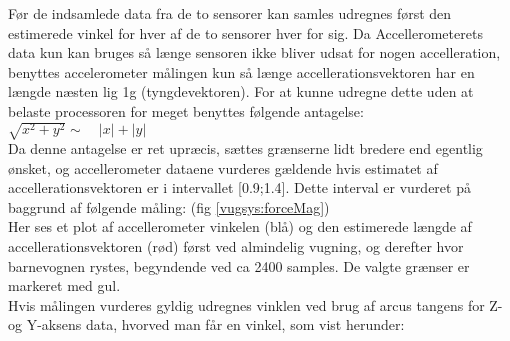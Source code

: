 Før de indsamlede data fra de to sensorer kan samles udregnes først den estimerede vinkel for hver af de to sensorer hver for sig. Da Accellerometerets data kun kan bruges så længe sensoren ikke bliver udsat for nogen accelleration, benyttes accelerometer målingen kun så længe accellerationsvektoren har en længde næsten lig 1g (tyngdevektoren). For at kunne udregne dette uden at belaste processoren for meget benyttes følgende antagelse:\\
	$\sqrt { { x }^{ 2 }+{ y }^{ 2 } } \sim \quad \left| x \right| +\left| y \right|$ \\
Da denne antagelse er ret upræcis, sættes grænserne lidt bredere end egentlig ønsket, og accellerometer dataene vurderes gældende hvis estimatet af accellerationsvektoren er i intervallet [0.9;1.4]. Dette interval er vurderet på baggrund af følgende måling: (fig \ref{vugsys:forceMag})\\
Her ses et plot af accellerometer vinkelen (blå) og den estimerede længde af accellerationsvektoren (rød) først ved almindelig vugning, og derefter hvor barnevognen rystes, begyndende ved ca 2400 samples. De valgte grænser er markeret med gul.\\
Hvis målingen vurderes gyldig udregnes vinklen ved brug af arcus tangens for Z- og Y-aksens data, hvorved man får en vinkel, som vist herunder:\\
